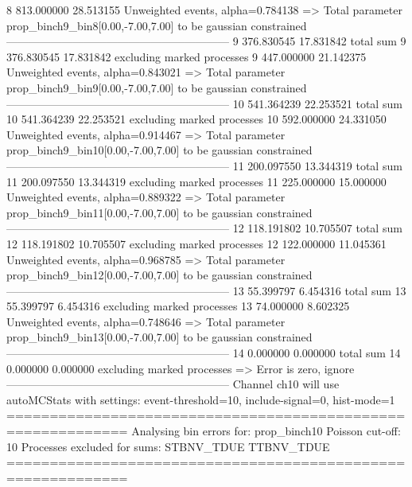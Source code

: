 8          813.000000      28.513155       Unweighted events, alpha=0.784138
  => Total parameter prop_binch9_bin8[0.00,-7.00,7.00] to be gaussian constrained
------------------------------------------------------------
9          376.830545      17.831842       total sum                     
9          376.830545      17.831842       excluding marked processes    
9          447.000000      21.142375       Unweighted events, alpha=0.843021
  => Total parameter prop_binch9_bin9[0.00,-7.00,7.00] to be gaussian constrained
------------------------------------------------------------
10         541.364239      22.253521       total sum                     
10         541.364239      22.253521       excluding marked processes    
10         592.000000      24.331050       Unweighted events, alpha=0.914467
  => Total parameter prop_binch9_bin10[0.00,-7.00,7.00] to be gaussian constrained
------------------------------------------------------------
11         200.097550      13.344319       total sum                     
11         200.097550      13.344319       excluding marked processes    
11         225.000000      15.000000       Unweighted events, alpha=0.889322
  => Total parameter prop_binch9_bin11[0.00,-7.00,7.00] to be gaussian constrained
------------------------------------------------------------
12         118.191802      10.705507       total sum                     
12         118.191802      10.705507       excluding marked processes    
12         122.000000      11.045361       Unweighted events, alpha=0.968785
  => Total parameter prop_binch9_bin12[0.00,-7.00,7.00] to be gaussian constrained
------------------------------------------------------------
13         55.399797       6.454316        total sum                     
13         55.399797       6.454316        excluding marked processes    
13         74.000000       8.602325        Unweighted events, alpha=0.748646
  => Total parameter prop_binch9_bin13[0.00,-7.00,7.00] to be gaussian constrained
------------------------------------------------------------
14         0.000000        0.000000        total sum                     
14         0.000000        0.000000        excluding marked processes    
  => Error is zero, ignore      
------------------------------------------------------------
Channel ch10 will use autoMCStats with settings: event-threshold=10, include-signal=0, hist-mode=1
============================================================
Analysing bin errors for: prop_binch10
Poisson cut-off: 10
Processes excluded for sums: STBNV_TDUE TTBNV_TDUE
============================================================
